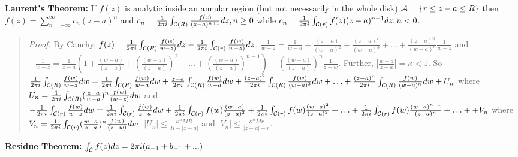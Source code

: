 {\bf Laurent's Theorem:} If $f(z)$ is analytic inside an annular region (but
not necessarily in the whole disk) ${\cal A} = \{ r \leq {z-a} \leq R \}$ 
then  $f(z)= \sum_{n= - \infty}^{\infty} c_n (z-a)^n$ and
$c_n= {\frac 1 {2 \pi i}} \int_{{\cal C}(R)} {\frac {f(z)}{(z-a)^{n+1}}} dz, n \geq 0$ while
$c_n= {\frac 1 {2 \pi i}} \int_{{\cal C}(r)} f(z) (z-a)^{n-1} dz, n < 0$.
\begin{quote}
\emph{Proof:}
By Cauchy,
$f(z)= {\frac 1 {2 \pi i}} \int_{{\cal C}(R)} {\frac {f(w)}{w-z)}} dz -
{\frac 1 {2 \pi i}} \int_{{\cal C}(r)} {\frac {f(w)}{w-z)}} dz$.
${\frac 1 {w-z}}=
{\frac 1 {w-a} } +
{\frac {(z-a)} {(w-a)^2}}+
{\frac {(z-a)^2} {(w-a)^3}}+ \ldots +
{\frac {(z-a)^n} {(w-a)^{n}}} {\frac 1 {w-z}}$ and
$-{\frac 1 {w-z}}=
{\frac 1 {z-a} } (1 +
{\frac {(w-a)} {(z-a)}}+
({\frac {(w-a)} {(z-a)}})^2+ \ldots +
({\frac {(w-a)} {(z-a)}})^{n-1})+ 
({\frac {(w-a)} {(z-a)}})^{n} {\frac 1 {z-w}}$.  Further,
$|{\frac {w-a}{z-a}}|= \kappa < 1$.  So
$
{\frac 1 {2 \pi i}} \int_{{\cal C}(R)} {\frac {f(w)} {w-z}} dw=
{\frac 1 {2 \pi i}} \int_{{\cal C}(R)} {\frac {f(w)} {w-a}} dw +
{\frac {z-a} {2 \pi i}} \int_{{\cal C}(R)} {\frac {f(w)} {w-a}} dw +
{\frac {(z-a)^2} {2 \pi i}} \int_{{\cal C}(R)} {\frac {f(w)} {(w-a)^2}} dw + \ldots +
{\frac {(z-a)^n} {2 \pi i}} \int_{{\cal C}(R)} {\frac {f(w)} {(w-a)^n}} dw + U_n$  where
$U_n= {\frac 1 {2 \pi i}} \int_{{\cal C}(R)} ({\frac {z-a} {w-a}})^n{\frac {f(w)} {(w-z)}} dw$
and
$
-{\frac 1 {2 \pi i}} \int_{{\cal C}(r)} {\frac {f(w)} {w-z}} dw=
{\frac 1 {2 \pi i}} \int_{{\cal C}(r)} {\frac {f(w)} {z-a}} dw +
{\frac 1 {2 \pi i}} \int_{{\cal C}(r)} f(w) {\frac {(w-a)} {(z-a)^2}} +
{\frac 1 {2 \pi i}} \int_{{\cal C}(r)} f(w) {\frac {(w-a)^2} {(z-a)^3}} + \ldots +
{\frac 1 {2 \pi i}} \int_{{\cal C}(r)} f(w) {\frac {(w-a)^{n-1}} {(z-a)^n}} + \ldots +
+ V_n$  
where
$V_n= {\frac 1 {2 \pi i}} \int_{{\cal C}(r)} ({\frac {w-a} {z-a}})^n{\frac {f(w)} {(z-w)}} dw$.
$|U_n| \leq  {\frac {\kappa^n M R} {R- |z-a|}}$ and
$|V_n| \leq  {\frac {\kappa^n M r} {|z-a|-r}}$.
\end{quote}
{\bf Residue Theorem:}
$\int_{\cal C} f(z) dz = 2 \pi i (a_{-1} + b_{-1} + ... )$.
\begin{quote}
\end{quote}
